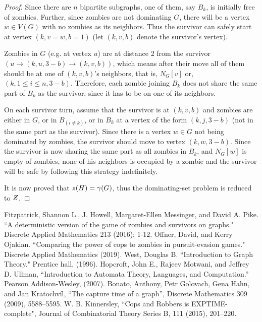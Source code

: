 \documentclass[1p]{elsarticle}
\newcommand{\NPZ}{\ooalign{$Z$\cr\hfil\rule[.8ex]{.3em}{.09ex}\hfil\cr}}
\newcommand{\zn}{\ooalign{$z$\cr\hfil\rule[.5ex]{.2em}{.08ex}\hfil\cr}}
\begin{document}
\begin{proof}
		Since there are $n$ bipartite subgraphs, one of them, say $B_k$, is initially free of zombies. Further, since zombies are
		not dominating $G$, there will be a vertex $w \in V(G)$ with no zombies as its neighbors. Thus the survivor can
		safely start at vertex $(k,v = w,b = 1)$ (let $(k,v,b)$ denote the survivor's vertex).

		Zombies in $G$ (e.g. at vertex $u$) are at distance 2 from the survivor $(u \rightarrow (k,u,3 - b) \rightarrow
		(k,v,b))$, which means after their move all of them should be at one of $(k,v,b)$'s neighbors, that is, $N_G[v]
		$ or, $ (k,1 \leq i \leq n,3 - b)$. Therefore, each zombie joining $B_k$ does not share the same part of
		$B_k$ as the survivor, since it has to be on one of its neighbors.
		
		On each survivor turn, assume that the survivor is at $(k,v,b)$ and zombies are either in $G$, or in $B_{(i \neq
		k)}$, or in $B_k$ at a vertex of the form $(k,j,3-b)$ (not in the same part as the survivor). Since there
		is a vertex $w \in G$ not being dominated by zombies, the survivor should move to vertex $(k,w,3-b)$. Since the
		survivor is now sharing the same part as all zombies in $B_k$, and $N_G[w]$ is empty of zombies, none of
		his neighbors is occupied by a zombie and the survivor will be safe by following this strategy indefinitely.

		It is now proved that $\zn(H) = \gamma(G)$, thus the dominating-set problem is reduced to $\NPZ$.

	\end{proof}
\begin{thebibliography}{999}
	
	Fitzpatrick, Shannon L., J. Howell, Margaret-Ellen Messinger, and David A. Pike. ``A deterministic version of the
	game of zombies and survivors on graphs." Discrete Applied Mathematics 213 (2016): 1-12.
	Offner, David, and Kerry Ojakian. ``Comparing the power of cops to zombies in pursuit-evasion games." Discrete
	Applied Mathematics (2019).
	West, Douglas B. ``Introduction to Graph Theory." Prentice hall, (1996).
	Hopcroft, John E., Rajeev Motwani, and Jeffrey D. Ullman, ``Introduction to Automata Theory, Languages, and
	Computation.'' Pearson Addison-Wesley, (2007).
	Bonato, Anthony, Petr Golovach, Gena Hahn, and Jan Kratochvíl, ``The capture time of a graph'', Discrete Mathematics
	309 (2009), 5588–5595.
	W. B. Kinnersley, ``Cops and Robbers is EXPTIME-complete", Journal of Combinatorial Theory Series B, 111 (2015), 201–220.
\end{thebibliography}
	
\end{document}
